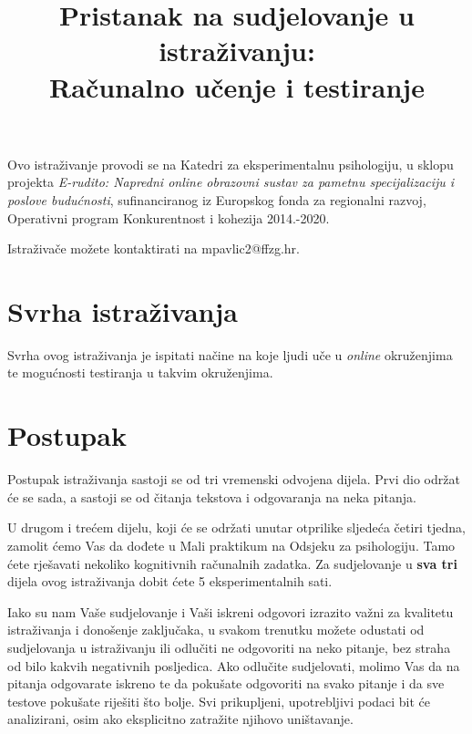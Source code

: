 \documentclass[11pt]{article}
\title{\bfseries \large Pristanak na sudjelovanje u istraživanju:\\
        \Large Računalno učenje i testiranje}
\date{}
\author{}
\begin{document}
\maketitle

\vspace*{-4em}

\noindent Ovo istraživanje provodi se na Katedri za eksperimentalnu psihologiju, u sklopu
projekta \textit{E-rudito: Napredni online obrazovni sustav za pametnu
    specijalizaciju i poslove budućnosti}, sufinanciranog iz Europskog fonda za
regionalni razvoj, Operativni program Konkurentnost i kohezija 2014.-2020.

\vspace{6pt}

\noindent Istraživače možete kontaktirati na mpavlic2@ffzg.hr.

\section{Svrha istraživanja}

Svrha ovog istraživanja je ispitati načine na koje ljudi uče u \textit{online}
okruženjima te mogućnosti testiranja u takvim okruženjima.

\section{Postupak}

Postupak istraživanja sastoji se od tri vremenski odvojena dijela. Prvi dio
održat će se sada, a sastoji se od čitanja tekstova i odgovaranja na neka
pitanja.

U drugom i trećem dijelu, koji će se održati unutar otprilike sljedeća četiri
tjedna, zamolit ćemo Vas da dođete u Mali praktikum na Odsjeku za psihologiju.
Tamo ćete rješavati nekoliko kognitivnih računalnih zadatka. Za sudjelovanje u
\textbf{sva tri} dijela ovog istraživanja
dobit ćete 5 eksperimentalnih sati.  

Iako su nam Vaše sudjelovanje i Vaši iskreni odgovori izrazito važni za
kvalitetu istraživanja i donošenje zaključaka, u svakom trenutku možete odustati
od sudjelovanja u istraživanju ili odlučiti ne odgovoriti na neko pitanje, bez
straha od bilo kakvih negativnih posljedica. Ako odlučite sudjelovati,
molimo Vas da na pitanja odgovarate iskreno te da pokušate odgovoriti na svako
pitanje i da sve testove pokušate riješiti što bolje. Svi prikupljeni,
upotrebljivi podaci bit će analizirani, osim ako eksplicitno zatražite
njihovo uništavanje.
\end{document}
